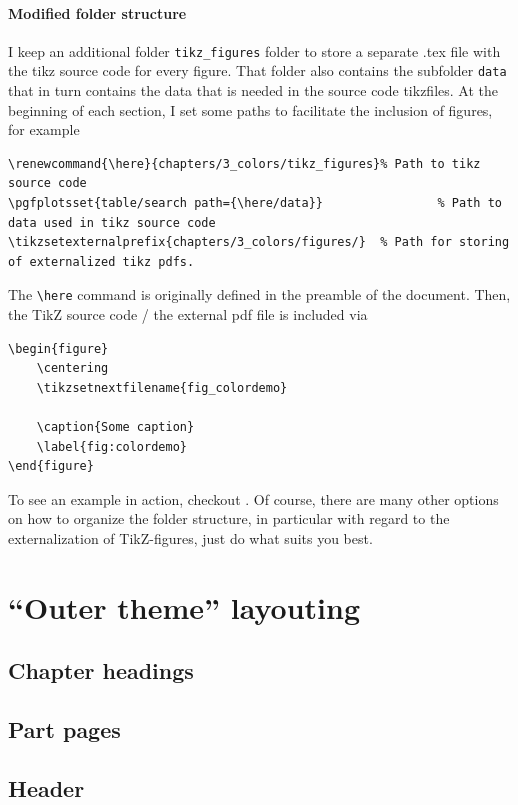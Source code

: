 \paragraph{Modified folder structure}
I keep an additional folder \verb|tikz_figures| folder to store a separate .tex file with the tikz source code for every figure. That folder also contains the subfolder \verb|data| that in turn contains the data that is needed in the source code tikzfiles. At the beginning of each section, I set some paths to facilitate the inclusion of figures, for example
\begin{lstlisting}
\renewcommand{\here}{chapters/3_colors/tikz_figures}% Path to tikz source code
\pgfplotsset{table/search path={\here/data}}				% Path to data used in tikz source code
\tikzsetexternalprefix{chapters/3_colors/figures/}	% Path for storing of externalized tikz pdfs.
\end{lstlisting}
The \verb|\here| command is originally defined in the preamble of the document.
Then, the TikZ source code / the external pdf file is included via
\begin{lstlisting}
\begin{figure}
	\centering
	\tikzsetnextfilename{fig_colordemo}
	
	\caption{Some caption}
	\label{fig:colordemo}
\end{figure}
\end{lstlisting}
To see an example in action, checkout .
Of course, there are many other options on how to organize the folder structure, in particular with regard to the externalization of TikZ-figures, just do what suits you best.

\section{``Outer theme'' layouting}

\subsection{Chapter headings}

\subsection{Part pages}

\subsection{Header}




